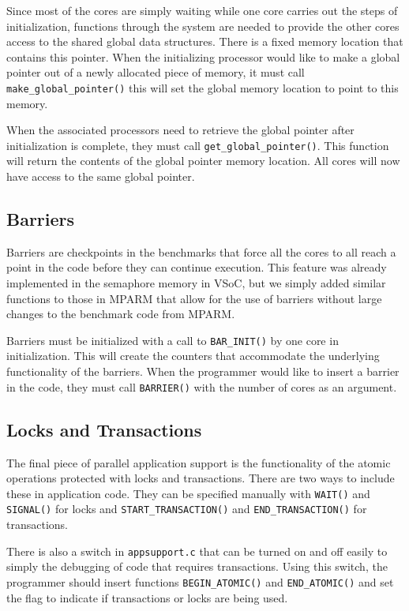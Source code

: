 \documentclass{article}
\begin{document}
Since most of the cores are simply waiting while one core carries out the steps of initialization, functions
through the system are needed to provide the other cores access to the shared global data structures. 
There is a fixed memory location that contains this pointer.  When the initializing processor would like
to make a global pointer out of a newly allocated piece of memory, it must call \verb|make_global_pointer()|
this will set the global memory location to point to this memory. 

When the associated processors need to retrieve the global pointer after initialization is complete, they 
must call \verb|get_global_pointer()|.  This function will return the contents of the global pointer memory
location.  All cores will now have access to the same global pointer. 

\subsection{Barriers}

Barriers are checkpoints in the benchmarks that force all the cores to all reach a point in the code before they 
can continue execution.  This feature was already implemented in the semaphore memory in VSoC, but we
simply added similar functions to those in MPARM that allow for the use of barriers without large changes to
the benchmark code from MPARM.

Barriers must be initialized with a call to \verb|BAR_INIT()| by one core in initialization.  This will create the counters
that accommodate the underlying functionality of the barriers.  When the programmer would like to insert a barrier 
in the code, they must call \verb|BARRIER()| with the number of cores as an argument.

\subsection{Locks and Transactions}

The final piece of parallel application support is the functionality of the atomic operations protected with locks and 
transactions. There are two ways to include these in application code.  They can be specified manually with 
 \verb|WAIT()| and  \verb|SIGNAL()| for locks and \verb|START_TRANSACTION()| and \verb|END_TRANSACTION()|
for transactions. 

There is also a switch in \verb|appsupport.c| that can be turned on and off easily to simply the debugging of code 
that requires transactions.  Using this switch, the programmer should insert functions \verb|BEGIN_ATOMIC()| 
and \verb|END_ATOMIC()| and set the flag to indicate if transactions or locks are being used. 
\end{document}
